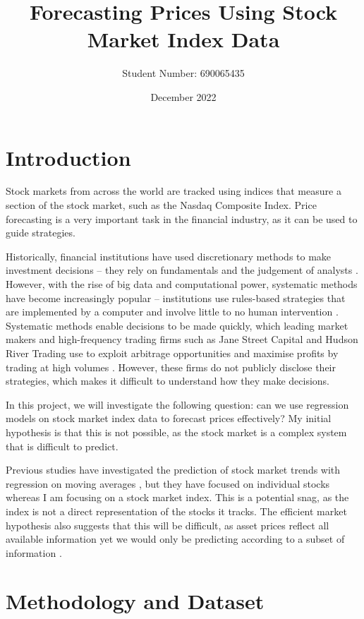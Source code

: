 \documentclass[a4paper, 11pt]{article}
\begin{document}
\title{Forecasting Prices Using Stock Market Index Data}
\author{Student Number: 690065435}
\date{December 2022}
\maketitle

\section{Introduction}
Stock markets from across the world are tracked using indices that measure a section of the stock market, such as the Nasdaq Composite Index. Price forecasting is a very important task in the financial industry, as it can be used to guide strategies.

Historically, financial institutions have used discretionary methods to make investment decisions -- they rely on fundamentals and the judgement of analysts \cite{harvey2017man}. However, with the rise of big data and computational power, systematic methods have become increasingly popular -- institutions use rules-based strategies that are implemented by a computer and involve little to no human intervention \cite{harvey2017man}. Systematic methods enable decisions to be made quickly, which leading market makers and high-frequency trading firms such as Jane Street Capital and Hudson River Trading use to exploit arbitrage opportunities and maximise profits by trading at high volumes \cite{aldridge2013high}. However, these firms do not publicly disclose their strategies, which makes it difficult to understand how they make decisions.

In this project, we will investigate the following question: can we use regression models on stock market index data to forecast prices effectively? My initial hypothesis is that this is not possible, as the stock market is a complex system that is difficult to predict.

Previous studies have investigated the prediction of stock market trends with regression on moving averages \cite{dinesh2021prediction}, but they have focused on individual stocks whereas I am focusing on a stock market index. This is a potential snag, as the index is not a direct representation of the stocks it tracks. The efficient market hypothesis also suggests that this will be difficult, as asset prices reflect all available information yet we would only be predicting according to a subset of information \cite{fama1970efficient}. 

\section{Methodology and Dataset}
\end{document}
